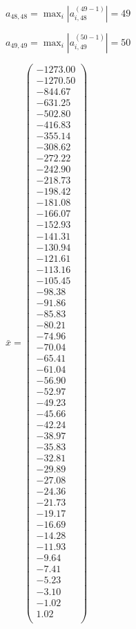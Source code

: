 \documentclass[a4paper,12pt]{article}
\begin{document}
$a _{ 48, 48 } =  \max _i |a _{ i, 48 } ^{ (49 - 1) } | = 49$

$a _{ 49, 49 } =  \max _i |a _{ i, 49 } ^{ (50 - 1) } | = 50$

$\bar { x } = \begin{pmatrix}
-1273.00 \\
-1270.50 \\
-844.67 \\
-631.25 \\
-502.80 \\
-416.83 \\
-355.14 \\
-308.62 \\
-272.22 \\
-242.90 \\
-218.73 \\
-198.42 \\
-181.08 \\
-166.07 \\
-152.93 \\
-141.31 \\
-130.94 \\
-121.61 \\
-113.16 \\
-105.45 \\
-98.38 \\
-91.86 \\
-85.83 \\
-80.21 \\
-74.96 \\
-70.04 \\
-65.41 \\
-61.04 \\
-56.90 \\
-52.97 \\
-49.23 \\
-45.66 \\
-42.24 \\
-38.97 \\
-35.83 \\
-32.81 \\
-29.89 \\
-27.08 \\
-24.36 \\
-21.73 \\
-19.17 \\
-16.69 \\
-14.28 \\
-11.93 \\
-9.64 \\
-7.41 \\
-5.23 \\
-3.10 \\
-1.02 \\
1.02 \\
\end{pmatrix}
$
\end{document}
